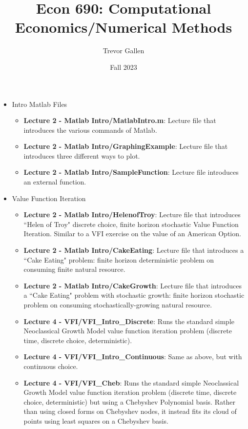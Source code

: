 \documentclass[a4paper]{article}
\title{Econ 690: Computational Economics/Numerical Methods}
\author{Trevor Gallen}
\date{Fall 2023}
\begin{document}

\maketitle

\begin{itemize}
\item Intro Matlab Files
\begin{itemize}
\item \textbf{Lecture 2 - Matlab Intro/MatlabIntro.m}:  Lecture file that introduces the various commands of Matlab. 
\item \textbf{Lecture 2 - Matlab Intro/GraphingExample}:  Lecture file that introduces three different ways to plot.
\item \textbf{Lecture 2 - Matlab Intro/SampleFunction}:  Lecture file introduces an external function.
\end{itemize}
\item Value Function Iteration
\begin{itemize}
\item \textbf{Lecture 2 - Matlab Intro/HelenofTroy}:  Lecture file that introduces ``Helen of Troy" discrete choice, finite horizon stochastic Value Function Iteration.  Similar to a VFI exercise on the value of an American Option.
\item \textbf{Lecture 2 - Matlab Intro/CakeEating}:  Lecture file that introduces a ``Cake Eating" problem: finite horizon deterministic problem on consuming finite natural resource.
\item \textbf{Lecture 2 - Matlab Intro/CakeGrowth}:  Lecture file that introduces a ``Cake Eating" problem with stochastic growth: finite horizon stochastic problem on consuming stochastically-growing natural resource.
\item \textbf{Lecture 4 - VFI/VFI\_Intro\_Discrete}:  Runs the standard simple Neoclassical Growth Model value function iteration problem (discrete time, discrete choice, deterministic).
\item \textbf{Lecture 4 - VFI/VFI\_Intro\_Continuous}:  Same as above, but with continuous choice.
\item \textbf{Lecture 4 - VFI/VFI\_Cheb}:  Runs the standard simple Neoclassical Growth Model value function iteration problem (discrete time, discrete choice, deterministic) but using a Chebyshev Polynomial basis.  Rather than using closed forms on Chebyshev nodes, it instead fits its cloud of points using least squares on a Chebyshev basis.  

\end{itemize}
\end{itemize}
\end{document}
